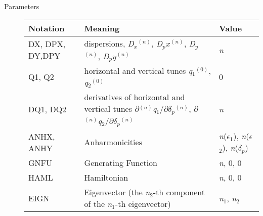 \begin{description}
	\item[Parameters] 
    \text{ \\} %
    
\begin{tabular}{p{2cm} p{7cm} p{2cm}}
\hline 
\textbf{Notation} & \textbf{Meaning} & \textbf{Value} \\ 
\hline
DX, DPX, DY,DPY & dispersions, \textit{D$_x$}$^{(n)}$, \textit{D$_px$}$^{(n)}$, \textit{D$_y$}$^{(n)}$, \textit{D$_py$}$^{(n)}$ & 
\textit{n} \\ 
\hline
Q1, Q2 & horizontal and vertical tunes \textit{q}$_1$$^{(0)}$, \textit{q}$_2$$^{(0)}$ & 0 \\ 
\hline
DQ1, DQ2 & derivatives of horizontal and vertical tunes $\partial$$^{(n)}$\textit{q}$_1$/$\partial$\textit{$\delta$}$_\textit{p}$$^{(n)}$, $\partial$$^{(n)}$\textit{q}$_2$/$\partial$\textit{$\delta$}$_\textit{p}$$^{(n)}$ & \textit{n} \\ 
\hline
ANHX, ANHY & Anharmonicities & \textit{n}(\textit{$\epsilon$}$_1$),             \textit{n}(\textit{$\epsilon$}$_2$), \textit{n}(\textit{$\delta$}$_\textit{p}$) \\ 
\hline
GNFU & Generating Function & \textit{n}, 0, 0 \\ 
\hline
HAML & Hamiltonian  & \textit{n}, 0, 0 \\ 
\hline
EIGN & Eigenvector (the \textit{n}$_2$-th component of the \textit{n}$_1$-th eigenvector) & \textit{n}$_1$, \textit{n}$_2$ \\ 
\hline
\end{tabular}

\end{description}

